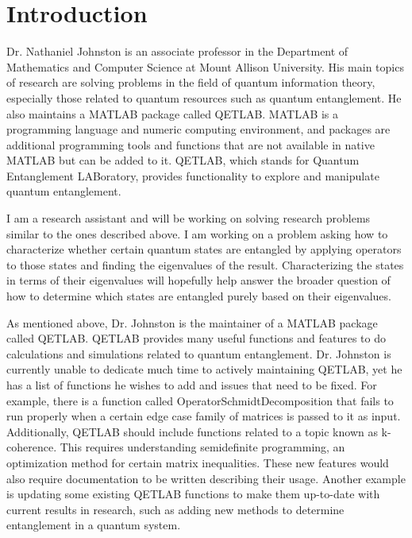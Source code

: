 \documentclass[12pt]{article}
\begin{document}
\sloppy





\newpage

\section{Introduction}
Dr. Nathaniel Johnston is an associate professor in the Department of Mathematics and Computer Science at Mount Allison University. His main topics of research are solving problems in the field of quantum information theory, especially those related to quantum resources such as quantum entanglement. He also maintains a MATLAB package called QETLAB. MATLAB is a programming language and numeric computing environment, and packages are additional programming tools and functions that are not available in native MATLAB but can be added to it. QETLAB, which stands for Quantum Entanglement LABoratory, provides functionality to explore and manipulate quantum entanglement.

I am a research assistant and will be working on solving research problems similar to the ones described above. I am working on a problem asking how to characterize whether certain quantum states are entangled by applying operators to those states and finding the eigenvalues of the result. Characterizing the states in terms of their eigenvalues will hopefully help answer the broader question of how to determine which states are entangled purely based on their eigenvalues.

As mentioned above, Dr. Johnston is the maintainer of a MATLAB package called QETLAB. QETLAB provides many useful functions and features to do calculations and simulations related to quantum entanglement. Dr. Johnston is currently unable to dedicate much time to actively maintaining QETLAB, yet he has a list of functions he wishes to add and issues that need to be fixed. For example, there is a function called OperatorSchmidtDecomposition that fails to run properly when a certain edge case family of matrices is passed to it as input. Additionally, QETLAB should include functions related to a topic known as k-coherence. This requires understanding semidefinite programming, an optimization method for certain matrix inequalities. These new features would also require documentation to be written describing their usage. Another example is updating some existing QETLAB functions to make them up-to-date with current results in research, such as adding new methods to determine entanglement in a quantum system.
\end{document}
